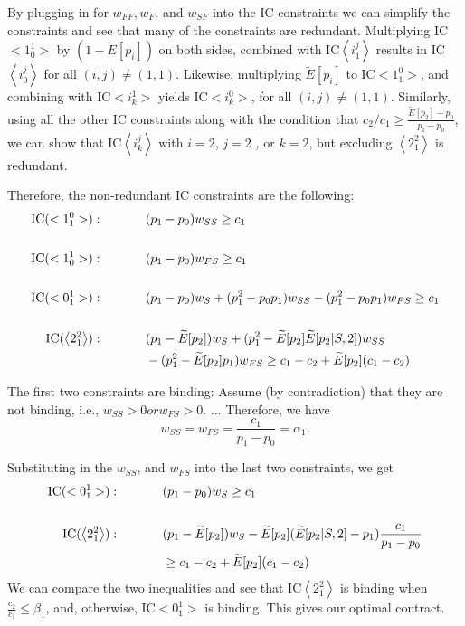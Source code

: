 \documentclass[11pt]{article} %
\theoremstyle{exampstyle}
\newcommand{\eq}[1]{\begin{align}#1\end{align}}
\newcommand{\la}{ \left < }
\newcommand{\ra}{ \right > }
\begin{document}
By plugging in for $w_{FF}, w_F$, and $w_{SF}$ into the IC constraints we can simplify the constraints and see that many of the constraints are redundant. Multiplying IC$<1^1_0>$ by $(1-\widetilde{E}[p_i])$ on both sides, combined with IC$\left <i^j_1 \right >$ results in IC$\left <i^j_0 \right > $ for all $(i,j) \ne (1,1)$. Likewise, multiplying $\widetilde{E}[p_i]$ to IC$<1^0_1>$, and combining with IC$<i^1_k>$ yields IC$<i^0_k>$,  for all $(i,j) \ne (1,1)$. Similarly, using all the other IC constraints along with the condition that $c_2/c_1 \ge \frac{\widetilde{E}[p_2]-p_0}{p_1-p_0}$, we can show that IC$\la i^j_k \ra$  with $i=2$, $j=2$ {\emph , or} $k=2$, but excluding $\la 2^2_1\ra$ is redundant.

Therefore, the non-redundant IC constraints are the following:
\eq{
\text{IC$(<1^0_1>):$} \hspace{.5in}  & (p_1-p_0)w_{SS} \ge c_1 \notag \\
\notag \\
\text{IC$(<1^1_0>):$} \hspace{.5in}  & (p_1-p_0)w_{FS} \ge c_1 \notag \\
\notag \\
\text{IC$(<0^1_1>):$} \hspace{.5in}  & (p_1-p_0)w_{S}+(p_1^2-p_0 p_1)w_{SS}-(p_1^2-p_0p_1)w_{FS}   \ge c_1 \notag \\
\notag \\
\text{IC$(\la 2^2_1\ra):$} \hspace{.5in}  & (p_1-\widetilde{E}[p_2])w_S + (p_1^2- \widetilde{E}[p_2] \widetilde{E}[p_2|S,2])w_{SS} \notag \\
& - (p_1^2 - \widetilde{E}[p_2] p_1) w_{FS} \ge c_1-c_2 + \widetilde{E}[p_2] (c_1-c_2)	\notag
}

The first two constraints are binding: Assume (by contradiction) that they are not binding, i.e., $w_{SS}>0 or w_{FS}>0$. ...
Therefore, we have
\[ w_{SS} = w_{FS} = \frac{c_1}{p_1-p_0} = \alpha_1. \]

Substituting in the $w_{SS}$,  and $w_{FS}$ into the last two constraints, we get
\eq{
\text{IC$(<0^1_1>):$} \hspace{.5in}  & (p_1-p_0) w_{S}   \ge c_1 \notag \\
\notag \\
\text{IC$(\la 2^2_1\ra):$} \hspace{.5in}  & (p_1-\widetilde{E}[p_2])w_S -\widetilde{E}[p_2] (\widetilde{E}[p_2|S,2]-p_1) \frac{c_1}{p_1-p_0}		\notag \\
& \ge c_1-c_2 + \widetilde{E}[p_2] (c_1-c_2)	\notag
}
We can compare the two inequalities and see that IC$\la 2^2_1\ra$ is binding when $\frac{c_2}{ c_1} \le  \beta_1$, and, otherwise, IC$<0^1_1>$ is binding. This gives our optimal contract. 
\end{document}
